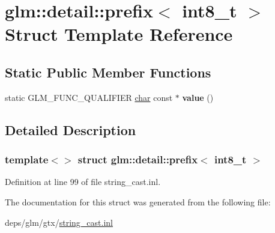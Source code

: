 \hypertarget{structglm_1_1detail_1_1prefix_3_01int8__t_01_4}{}\section{glm\+:\+:detail\+:\+:prefix$<$ int8\+\_\+t $>$ Struct Template Reference}
\label{structglm_1_1detail_1_1prefix_3_01int8__t_01_4}
\subsection*{Static Public Member Functions}
\begin{DoxyCompactItemize}
\item 
\mbox{\label{structglm_1_1detail_1_1prefix_3_01int8__t_01_4_afb4b2223c44e4e8f75bde375b0f874a2}} 
static G\+L\+M\+\_\+\+F\+U\+N\+C\+\_\+\+Q\+U\+A\+L\+I\+F\+I\+ER \hyperlink{classchar}{char} const  $\ast$ {\bfseries value} ()
\end{DoxyCompactItemize}


\subsection{Detailed Description}
\subsubsection*{template$<$$>$\newline
struct glm\+::detail\+::prefix$<$ int8\+\_\+t $>$}



Definition at line 99 of file string\+\_\+cast.\+inl.



The documentation for this struct was generated from the following file\+:\begin{DoxyCompactItemize}
\item 
deps/glm/gtx/\hyperlink{string__cast_8inl}{string\+\_\+cast.\+inl}\end{DoxyCompactItemize}
